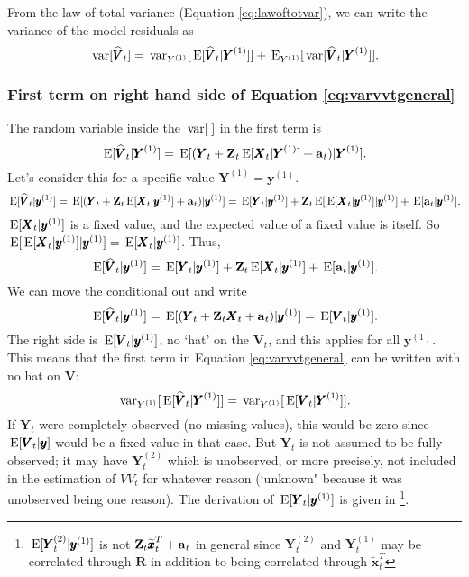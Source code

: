\documentclass[]{article}
\def\XI{\mbox{\boldmath $\Xi$}}
\def\E{\,\textup{\textrm{E}}}
\def\RR{\mbox{$\mathbf R$}}	 \def\rr{\mbox{$\mathbf r$}} \def\Rb{\mbox{$\mathbf H$}}	\def\Rm{\mathbb{R}}
\def\VV{\mbox{$\pmb{V}$}}	\def\vv{\mbox{$\pmb{v}$}}
\def\XX{\mbox{$\pmb{X}$}}	\def\xx{\mbox{$\pmb{x}$}}
\def\YY{\mbox{$\pmb{Y}$}}	\def\yy{\mbox{$\pmb{y}$}}
\def\ZZ{\mbox{$\mathbf Z$}}	\def\zz{\mbox{$\mathbf z$}}	\def\Zb{\mbox{$\mathbf M$}} \def\Za{\mbox{$\mathbf N$}} \def\Zm{\XI}
\def\var{\,\textup{\textrm{var}}}
\def\hatxtT{\widetilde{\xx}_t^T}
\def\hatVt{\widehat{\VV}_t}
\begin{document}
From the law of total variance (Equation \ref{eq:lawoftotvar}), we can write the variance of the model residuals as
\begin{equation}\label{eq:varvvtgeneral}
\var[\hatVt] = \var_{Y^{(1)}}[\E[\hatVt|\YY^{(1)}]] + \E_{Y^{(1)}}[\var[\hatVt|\YY^{(1)}]] .
\end{equation}

\subsubsection{First term on right hand side of Equation \ref{eq:varvvtgeneral}}

The random variable inside the $\var[\;]$ in the first term is
\begin{equation}\label{eq:first.term.rhs.varvvtgeneral}
\E[\hatVt|\YY^{(1)}]= \E[(\YY_t + \ZZ_t \E[\XX_t|\YY^{(1)}] + \aa_t)|\YY^{(1)}] .
\end{equation}
Let's consider this for a specific value $\YY^{(1)}=\yy^{(1)}$.
\begin{equation}
\E[\hatVt|\yy^{(1)}] = \E[(\YY_t + \ZZ_t \E[\XX_t|\yy^{(1)}] + \aa_t)|\yy^{(1)}] =
\E[\YY_t|\yy^{(1)}] + \ZZ_t \E[\E[\XX_t|\yy^{(1)}]|\yy^{(1)}] + \E[\aa_t|\yy^{(1)}] .
\end{equation}
$\E[\XX_t|\yy^{(1)}]$ is a fixed value, and the expected value of a fixed value is itself. So $\E[\E[\XX_t|\yy^{(1)}]|\yy^{(1)}]=\E[\XX_t|\yy^{(1)}]$. 
Thus,
\begin{equation}
\E[\hatVt|\yy^{(1)}] = \E[\YY_t|\yy^{(1)}] + \ZZ_t \E[\XX_t|\yy^{(1)}] + \E[\aa_t|\yy^{(1)}] .
\end{equation}
We can move the conditional out and write
\begin{equation}
\E[\hatVt|\yy^{(1)}]= \E[(\YY_t + \ZZ_t \XX_t + \aa_t)|\yy^{(1)}]=\E[\VV_t|\yy^{(1)}].
\end{equation}
The right side is $\E[\VV_t|\yy^{(1)}]$, no `hat' on the $\VV_t$, and this applies for all $\yy^{(1)}$.  This means that the first term in Equation \ref{eq:varvvtgeneral} can be written with no hat on $\VV$:
\begin{equation}\label{eq:no.hat.on.V}
\var_{Y^{(1)}}[\E[\hatVt|\YY^{(1)}]] = \var_{Y^{(1)}}[\E[\VV_t|\YY^{(1)}]] .
\end{equation}
If $\YY_t$ were completely observed (no missing values), this would be zero since $\E[\VV_t|\yy]$ would be a fixed value in that case. But $\YY_t$ is not assumed to be fully observed; it may have $\YY^{(2)}_t$ which is unobserved, or more precisely, not included in the estimation of $VV_t$ for whatever reason (`unknown" because it was unobserved being one reason). The derivation of $\E[\YY_t|\yy^{(1)}]$ is given in \citet{Holmes2010}\footnote{$\E[\YY^{(2)}_t|\yy^{(1)}]$ is not $\ZZ_t \hatxtT + \aa_t$ in general since $\YY^{(2)}_t$ and $\YY^{(1)}_t$ may be correlated through $\RR$ in addition to being correlated through $\hatxtT$}.
\end{document}
